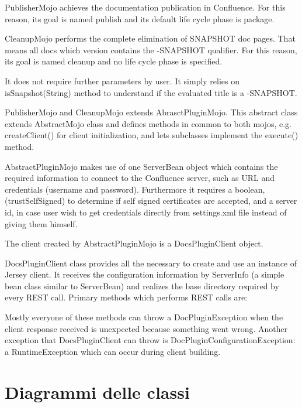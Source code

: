 PublisherMojo  achieves the documentation publication in Confluence. For this reason, its goal is named publish and its default life cycle phase is package.

CleanupMojo performs the complete elimination of SNAPSHOT doc pages. That means all docs which version contains the -SNAPSHOT qualifier. For this reason, its goal is named cleanup and no life cycle phase is specified.

It does not require further parameters by user. It simply relies on isSnapshot(String) method to understand if the evaluated title is a -SNAPSHOT.



PublisherMojo and CleanupMojo extends AbrasctPluginMojo. This abstract class extends AbstractMojo class and defines methods in common to both mojos, e.g. createClient() for client initialization, and lets subclasses implement the execute() method.

AbstractPluginMojo makes use of one ServerBean object which contains the required information to connect to the Confluence server, such as URL and credentials (username and password). Furthermore it requires a boolean, (trustSelfSigned) to determine if self signed certificates are accepted, and a server id, in case user wish to get credentials directly from settings.xml file instead of giving them himself.

The client created by AbstractPluginMojo is a DocsPluginClient object. 



DocsPluginClient class provides all the necessary to create and use an instance of Jersey client. It receives the configuration information by ServerInfo (a simple bean class similar to ServerBean) and realizes the base directory required by every REST call. Primary methods which performs REST calls are:

Mostly everyone of these methods can throw a DocPluginException when the client response received is unexpected because something went wrong. Another exception that DocsPluginClient can throw is DocPluginConfigurationException: a RuntimeException which can occur during client building.

\section{Diagrammi delle classi}
\label{sec:diagrammi-classi}

